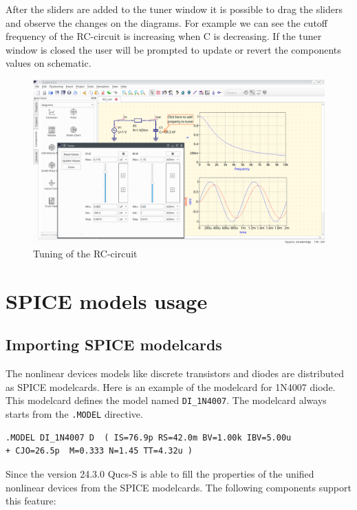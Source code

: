 \documentclass[a4paper,12pt]{article}
\begin{document}
After the sliders are added to the tuner window it is possible to drag the sliders and observe the changes on the diagrams. For example we can see the cutoff frequency of the RC-circuit is increasing when C is decreasing. If the tuner window is closed the user will be prompted to update or revert the components values on schematic. 

    \begin{figure}[!ht]
    \begin{center}
        \includegraphics[width=\textwidth]{img/tuner_rc.png}
    \end{center}
    \caption{Tuning of the RC-circuit} \label{fig:tuner_rc}
    \end{figure}
    
    
\section{SPICE models usage} 

\subsection{Importing SPICE modelcards}

The nonlinear devices models like discrete transistors and diodes are distributed as SPICE modelcards. Here is an example of the modelcard for 1N4007 diode. This modelcard defines the model named \verb|DI_1N4007|. The modelcard always starts from the \verb|.MODEL| directive.

\begin{verbatim}
.MODEL DI_1N4007 D  ( IS=76.9p RS=42.0m BV=1.00k IBV=5.00u
+ CJO=26.5p  M=0.333 N=1.45 TT=4.32u )
\end{verbatim}

Since the version 24.3.0 Qucs-S is able to fill the properties of the unified nonlinear devices from the SPICE modelcards. The following components support this feature:
\end{document}
